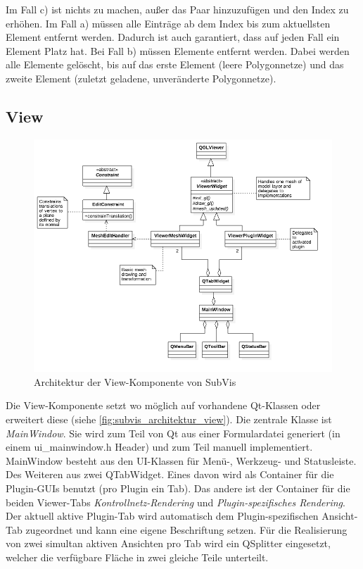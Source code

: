 Im Fall c) ist nichts zu machen, außer das Paar hinzuzufügen und den Index zu erhöhen.
Im Fall a) müssen alle Einträge ab dem Index bis zum aktuellsten Element entfernt werden. 
Dadurch ist auch garantiert, dass auf jeden Fall ein Element Platz hat.
Bei Fall b) müssen Elemente entfernt werden. 
Dabei werden alle Elemente gelöscht, bis auf das erste Element (leere Polygonnetze) und das zweite Element (zuletzt geladene, unveränderte Polygonnetze).
 

\subsection{View}

\begin{figure}
  \centering
  \includegraphics[width=\textwidth]{content/media/subvis_architektur_view.png}
  \caption{Architektur der View-Komponente von SubVis}
  \label{fig:subvis_architektur_view}
\end{figure}

Die View-Komponente setzt wo möglich auf vorhandene Qt-Klassen oder erweitert diese (siehe \autoref{fig:subvis_architektur_view}).
Die zentrale Klasse ist \emph{MainWindow}. 
Sie wird zum Teil von Qt aus einer Formulardatei generiert (in einem ui\_mainwindow.h Header) und zum Teil manuell implementiert.
MainWindow besteht aus den UI-Klassen für Menü-, Werkzeug- und Statusleiste.
Des Weiteren aus zwei QTabWidget.
Eines davon wird als Container für die Plugin-GUIs benutzt (pro Plugin ein Tab).
Das andere ist der Container für die beiden Viewer-Tabs \emph{Kontrollnetz-Rendering} und \emph{Plugin-spezifisches Rendering}.
Der aktuell aktive Plugin-Tab wird automatisch dem Plugin-spezifischen Ansicht-Tab zugeordnet und kann eine eigene Beschriftung setzen.
Für die Realisierung von zwei simultan aktiven Ansichten pro Tab wird ein QSplitter eingesetzt, welcher die verfügbare Fläche in zwei gleiche Teile unterteilt.

